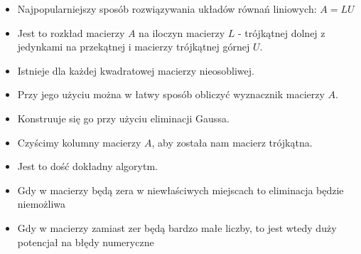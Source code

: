 \documentclass[a4paper]{article}
\begin{document}
\begin{itemize}
    \item Najpopularniejszy sposób rozwiązywania układów równań liniowych: $A = LU$
    \item Jest to rozkład macierzy $A$ na iloczyn macierzy $L$ - trójkątnej dolnej z jedynkami na przekątnej i macierzy trójkątnej górnej $U$.
    \item Istnieje dla każdej kwadratowej macierzy nieosobliwej.
    \item Przy jego użyciu można w łatwy sposób obliczyć wyznacznik macierzy $A$.
    \item Konstruuje się go przy użyciu eliminacji Gaussa.
    \item Czyścimy kolumny macierzy $A$, aby została nam macierz trójkątna.
    \item Jest to dość dokładny algorytm.
    \item Gdy w macierzy będą zera w niewłaściwych miejscach to eliminacja będzie niemożliwa
    \item Gdy w macierzy zamiast zer będą bardzo małe liczby, to jest wtedy duży potencjał na błędy numeryczne
\end{itemize}
\end{document}

